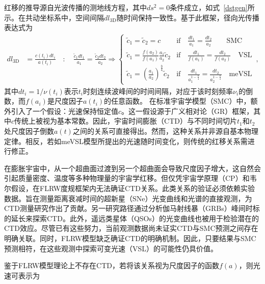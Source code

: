 \documentclass[jkps,preprint,fleqn]{revtex4}
\newcommand{\tc}{\tilde{c}}
\begin{document}
\begin{CJK*}{UTF8}{gbsn}
红移的推导源自光波传播的测地线方程，其中$ds^2 = 0$条件成立，如式~\eqref{dstgen}所示。在共动坐标系中，空间间隔$dl_{3\textrm{D}}$随时间保持一致性\cite{Lee:2024mal,Lee:2024zcu}。基于此框架，径向光传播表达式为
\begin{align}
d l_{3\textrm{D}} &= \frac{c(t_i) dt_i}{a(t_i)} \quad : \quad \frac{\tc_1 dt_1}{a_1} = \frac{\tc_2 dt_2}{a_2} \Rightarrow \begin{cases} \tc_1 = \tc_2 = c & \textrm{if} \quad \frac{dt_1}{a_1} = \frac{dt_2}{a_2} \qquad \textrm{SMC} \\
\tc_1 = \frac{f(a_2)}{f(a_1)} \frac{a_1}{a_2} \tc_2 & \textrm{if} \quad \frac{dt_1}{f(a_1)} = \frac{dt_2}{f(a_2)} \quad \textrm{VSL} \\ \tc_1 = \left( \frac{a_1}{a_2}\right)^{\frac{b}{4}} \tc_2 & \textrm{if} \quad \frac{dt_1}{a_1^{1-\frac{b}{4}}} = \frac{dt_2}{a_2^{1-\frac{b}{4}}} \quad \textrm{meVSL}  \end{cases} \,, \label{dl3D}
\end{align}
其中$dt_i = 1/\nu(t_i)$表示$t_i$时刻连续波峰间的时间间隔，对应于该时刻频率$\nu_i$的倒数，而$f(a_i)$是尺度因子$a(t_i)$的任意函数。
在标准宇宙学模型（SMC）中，额外引入了一个假设：光速保持恒定值$c$。这一假设源于广义相对论（GR）框架，其中$c$传统上被视为基本常数。因此，宇宙时间膨胀（CTD）与不同时间切片$t_1$和$t_2$处尺度因子倒数$a(t)$之间的关系可直接得出。然而，这种关系并非源自基本物理定律。相反，若如meVSL模型所提出的光速随时间变化，则传统的红移关系需进行修正。

在膨胀宇宙中，从一个超曲面过渡到另一个超曲面会导致尺度因子增大，这自然会引起质量密度、温度等多种物理量的宇宙学红移。但仅凭宇宙学原理（CP）和韦尔假设，在FLRW度规框架内无法确证CTD关系。此类关系的验证必须依赖实验数据。旨在测量距离衰减时间的超新星（SNe）光变曲线和光谱的直接观测，为CTD测量研究作出了贡献\cite{Leibundgut:1996qm,SupernovaSearchTeam:1997gem,Foley:2005qu,Blondin:2007ua,Blondin:2008mz,Lee:2023ucu,DES:2024vgg,Lee:2024kxa}。另一研究路径通过分析伽马射线暴（GRBs）峰间时标的延长来探索CTD\cite{Norris:1993hda,Wijers:1994qf,Band:1994ee,Meszaros:1995gj,Lee:1996zu,Chang:2001fy,Crawford:2009be,Zhang:2013yna,Singh:2021jgr}。此外，遥远类星体（QSOs）的光变曲线也被用于检验潜在的CTD效应\cite{Hawkins:2001be,Dai:2012wp,Lewis:2023jab}。尽管已有这些努力，当前观测数据尚未证实CTD与SMC预测之间存在明确关联。同时，FLRW模型缺乏确证CTD的明确机制。因此，只要结果与SMC预测相符，在这些观测中探索可变光速（VSL）的可能性仍具价值。

鉴于FLRW模型理论上不存在CTD，若将该关系视为尺度因子的函数$f(a)$，则光速可表示为


\end{CJK*}
\end{document}
